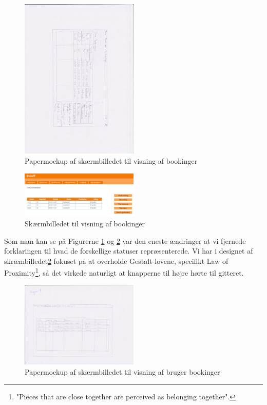 \begin{figure}[h!]
  \centering
    \includegraphics[width=0.5\textwidth]{Appendix/GUI-Prototype/PaperMockup/DineBookinger_001}
  \caption{Papermockup af skærmbilledet til visning af bookinger}
\label{Design_G_Development_YourBookings}
\end{figure} 

\begin{figure}[h!]
  \centering
    \includegraphics[width=0.5\textwidth]{Appendix/GUI-Prototype/DigitalMockup/DineBookinger}
  \caption{Skærmbilledet til visning af bookinger}
\label{Design_G_Development_YourBookings_Final}
\end{figure} 

Som man kan se på Figurerne \ref{Design_G_Development_YourBookings} og \ref{Design_G_Development_YourBookings_Final} var den eneste ændringer at vi fjernede forklaringen til hvad de forskellige statuser repræsenterede. Vi har i designet af skræmbilledet\ref{Design_G_Development_YourBookings_Final} fokuset på at overholde Gestalt-lovene\cite[s. 68]{SL_UID}, specifikt Law of Proximity\footnote{"Pieces that are close together are perceived as belonging together".}, så det virkede naturligt at knapperne til højre hørte til gitteret. 

\begin{figure}[h!]
  \centering
    \includegraphics[width=0.5\textwidth]{Appendix/GUI-Prototype/PaperMockup/GodkendBookinger_001}
  \caption{Papermockup af skærmbilledet til visning af bruger bookinger}
\label{Design_G_Development_ApproveBookings}
\end{figure} 

